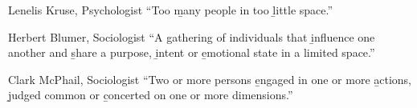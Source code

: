 \begin{block}{Lenelis Kruse, Psychologist}
    ``Too \b{many people} in too \b{little space}.''
\end{block}
\vspace{5mm}
\begin{block}{Herbert Blumer, Sociologist}
    ``A gathering of individuals that \b{influence one another} and \b{share a purpose}, \b{intent} or \b{emotional state} in a limited space.''
\end{block}
\vspace{5mm}
\begin{block}{Clark McPhail, Sociologist}
    ``Two or more persons \b{engaged in} one or more \b{actions}, \b{judged common} or \b{concerted} on one or more dimensions.''
\end{block}